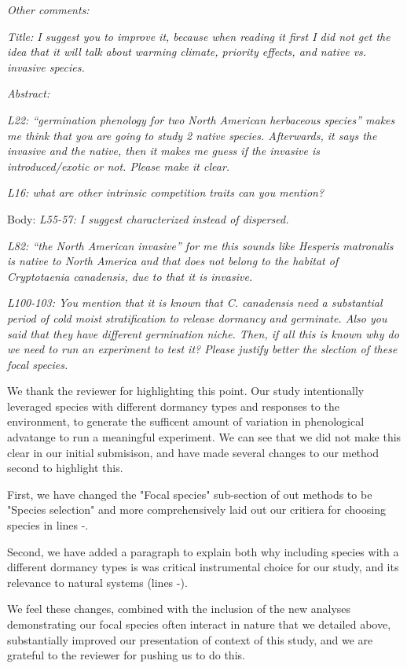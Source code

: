 \documentclass[11pt]{article}
\begin{document}
{\emph{Other comments:}

\emph{Title: I suggest you to improve it, because when reading it first I did not get the idea that it will talk about warming climate, priority effects, and native vs. invasive species.}


\emph{ Abstract:} 

\emph{L22: “germination phenology for two North American herbaceous species” makes me think that you are going to study 2 native species. Afterwards, it says the invasive and the native, then it makes me guess if the invasive is introduced/exotic or not. Please make it clear.}


\emph{L16: what are other intrinsic competition traits can you mention?}


Body:
\emph{L55-57: I suggest characterized instead of dispersed.}

\emph{L82: “the North American invasive” for me this sounds like Hesperis matronalis is native to North America and that does not belong to the habitat of Cryptotaenia canadensis, due to that it is invasive.}


\emph{L100-103: You mention that it is known that C. canadensis need a substantial period of cold moist stratification to release dormancy and germinate. Also you said that they have different germination niche. Then, if all this is known why do we need to run an experiment to test it? Please justify better the slection of these focal species.}

We thank the reviewer for highlighting this point. Our study intentionally leveraged species with different dormancy types and responses to the environment, to generate the sufficent amount of variation in phenological advatange to run a meaningful experiment. We can see that we did not make this clear in our initial submisison, and have made several changes to our method second to highlight this.

First, we have changed the "Focal species" sub-section of out methods to be "Species selection" and more comprehensively laid out our critiera for choosing species in lines -.

Second, we have added a paragraph to explain both why including species with a different dormancy types is was critical instrumental choice for our study, and its relevance to natural systems (lines -).

We feel these changes, combined with the inclusion of the new analyses demonstrating our focal species often interact in nature that we detailed above, substantially improved our presentation of context of this study, and we are grateful to the reviewer for pushing us to do this.

}
\end{document}
